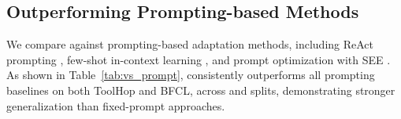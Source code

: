\subsection{Outperforming Prompting-based Methods}

We compare \shortname against prompting-based adaptation methods, including ReAct
prompting \citep{yao2023react}, few-shot in-context learning \citep{yizhe2021fewshot}, and prompt optimization with SEE \citep{cui2025see}.
As shown in Table~\ref{tab:vs_prompt}, \shortname consistently outperforms all prompting
baselines on both ToolHop and BFCL, across \rand and \unseen splits, demonstrating stronger
generalization than fixed-prompt approaches.

